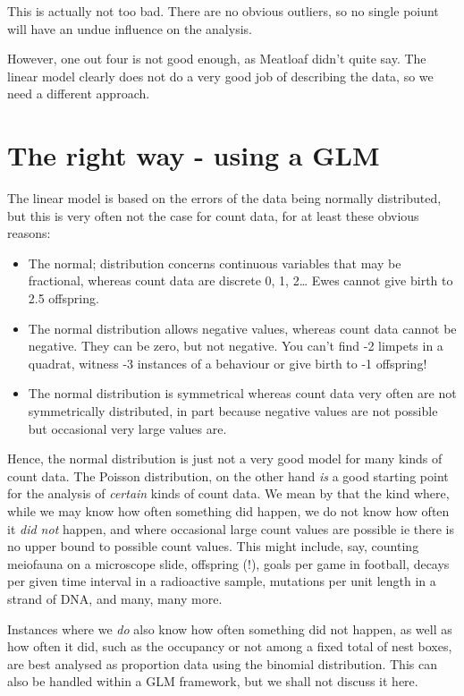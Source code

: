 \documentclass[
  letterpaper,
  DIV=11,
  numbers=noendperiod]{scrreprt}
\providecommand{\tightlist}{%
  \setlength{\itemsep}{0pt}\setlength{\parskip}{0pt}}\usepackage{longtable,booktabs,array}
\begin{document}
This is actually not too bad. There are no obvious outliers, so no
single poiunt will have an undue influence on the analysis.

However, one out four is not good enough, as Meatloaf didn't quite say.
The linear model clearly does not do a very good job of describing the
data, so we need a different approach.

\section{The right way - using a GLM}\label{the-right-way---using-a-glm}

The linear model is based on the errors of the data being normally
distributed, but this is very often not the case for count data, for at
least these obvious reasons:

\begin{itemize}
\tightlist
\item
  The normal; distribution concerns continuous variables that may be
  fractional, whereas count data are discrete 0, 1, 2\ldots{} Ewes
  cannot give birth to 2.5 offspring.
\item
  The normal distribution allows negative values, whereas count data
  cannot be negative. They can be zero, but not negative. You can't find
  -2 limpets in a quadrat, witness -3 instances of a behaviour or give
  birth to -1 offspring!
\item
  The normal distribution is symmetrical whereas count data very often
  are not symmetrically distributed, in part because negative values are
  not possible but occasional very large values are.
\end{itemize}

Hence, the normal distribution is just not a very good model for many
kinds of count data. The Poisson distribution, on the other hand
\emph{is} a good starting point for the analysis of \emph{certain} kinds
of count data. We mean by that the kind where, while we may know how
often something did happen, we do not know how often it \emph{did not}
happen, and where occasional large count values are possible ie there is
no upper bound to possible count values. This might include, say,
counting meiofauna on a microscope slide, offspring (!), goals per game
in football, decays per given time interval in a radioactive sample,
mutations per unit length in a strand of DNA, and many, many more.

Instances where we \emph{do} also know how often something did not
happen, as well as how often it did, such as the occupancy or not among
a fixed total of nest boxes, are best analysed as proportion data using
the binomial distribution. This can also be handled within a GLM
framework, but we shall not discuss it here.
\end{document}

